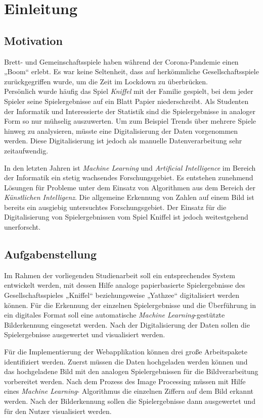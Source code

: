 \chapter{Einleitung}
\section{Motivation}
Brett- und Gemeinschaftsspiele haben während der Corona-Pandemie einen „Boom“ erlebt. Es war keine Seltenheit, dass auf herkömmliche Gesellschaftsspiele zurückgegriffen wurde, um die Zeit im Lockdown zu überbrücken. \cite{dw_2021}\\
Persönlich wurde häufig das Spiel \textit{Kniffel} mit der Familie gespielt, bei dem jeder Spieler seine Spielergebnisse auf ein Blatt Papier niederschreibt. Als Studenten der Informatik und Interessierte der Statistik sind die Spielergebnisse in analoger Form so nur mühselig auszuwerten. Um zum Beispiel Trends über mehrere Spiele hinweg zu analysieren, müsste eine Digitalisierung der Daten vorgenommen werden. Diese Digitalisierung ist jedoch als manuelle Datenverarbeitung sehr zeitaufwendig.

In den letzten Jahren ist \textit{Machine Learning} und \textit{Artificial Intelligence} im Bereich der Informatik ein stetig wachsendes Forschungsgebiet. 
Es entstehen zunehmend Lösungen für Probleme unter dem Einsatz von Algorithmen aus dem Bereich der \textit{Künstlichen Intelligenz}. Die allgemeine Erkennung von Zahlen auf einem Bild ist bereits ein ausgiebig untersuchtes Forschungsgebiet. Der Einsatz für die Digitalisierung von Spielergebnissen vom Spiel Kniffel ist jedoch weitestgehend unerforscht. 

\section{Aufgabenstellung}
Im Rahmen der vorliegenden Studienarbeit soll ein entsprechendes System entwickelt werden, mit dessen Hilfe analoge papierbasierte Spielergebnisse des
Gesellschaftsspieles „Kniffel“ beziehungsweise „Yathzee“ digitalisiert werden können. Für die Erkennung der einzelnen Spielergebnisse und die Überführung in ein digitales Format soll eine automatische \textit{Machine Learning}-gestützte Bilderkennung eingesetzt werden. Nach der Digitalisierung der Daten sollen die Spielergebnisse ausgewertet und visualisiert werden.

Für die Implementierung der Webapplikation können drei große Arbeitspakete identifiziert werden. Zuerst müssen die Daten hochgeladen werden können und das hochgeladene Bild mit den analogen Spielergebnissen für die Bildverarbeitung vorbereitet werden. Nach dem Prozess des Image Processing müssen mit Hilfe eines \textit{Machine Learning}-
Algorithmus die einzelnen Ziffern auf dem Bild erkannt werden.
Nach der Bilderkennung sollen die Spielergebnisse dann ausgewertet und für den Nutzer visualisiert werden.

